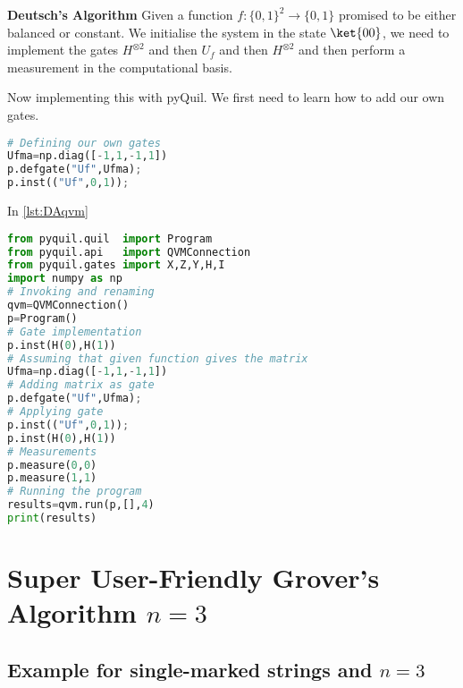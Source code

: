 \begin{tcolorbox}[standard jigsaw,
    opacityback=0,  %
    boxrule=0.5pt]
    {\bf Deutsch's Algorithm}
    \tcbline
    Given a function $f:\{0,1\}^2\rightarrow \{0,1\}$ promised to be either balanced or constant. We initialise the system in the state $\ket{00}$, we need to implement the gates $H^{\otimes 2}$ and then $U_f$ and then $H^{\otimes 2}$ and then perform a measurement in the computational basis.
\end{tcolorbox}

Now implementing this with pyQuil. We first need to learn how to add our own gates.

\begin{lstlisting}[language=Python]
# Defining our own gates
Ufma=np.diag([-1,1,-1,1])
p.defgate("Uf",Ufma); 
p.inst(("Uf",0,1)); 
\end{lstlisting}

In \autoref{lst:DAqvm}

\begin{lstlisting}[language=Python,caption={Deutsch's algorithm with pyQuil ($n=2$)},label={lst:DAqvm},frame=single]
from pyquil.quil  import Program
from pyquil.api   import QVMConnection 
from pyquil.gates import X,Z,Y,H,I 
import numpy as np
# Invoking and renaming
qvm=QVMConnection()
p=Program() 
# Gate implementation
p.inst(H(0),H(1)) 
# Assuming that given function gives the matrix
Ufma=np.diag([-1,1,-1,1])
# Adding matrix as gate
p.defgate("Uf",Ufma); 
# Applying gate
p.inst(("Uf",0,1)); 
p.inst(H(0),H(1))
# Measurements
p.measure(0,0)
p.measure(1,1) 
# Running the program
results=qvm.run(p,[],4) 
print(results)
\end{lstlisting}

\newpage
\section{Super User-Friendly Grover's Algorithm $n=3$}

\subsection{Example for single-marked strings and $n=3$}

